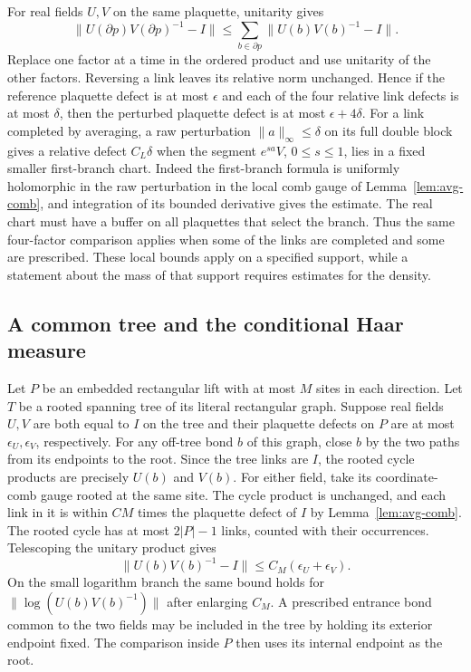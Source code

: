 \documentclass[11pt,letterpaper,reqno]{amsart}
\numberwithin{equation}{section}
\theoremstyle{definition}
\theoremstyle{remark}
\begin{document}
For real fields \(U,V\) on the same plaquette, unitarity gives
\begin{equation}\label{eq:guarded-four-link}
 \|U(\partial p)V(\partial p)^{-1}-I\|
   \leq \sum_{b\in\partial p}\|U(b)V(b)^{-1}-I\|.
\end{equation}
Replace one factor at a time in the ordered product and use
unitarity of the other factors. Reversing a link leaves its
relative norm unchanged. Hence if the reference plaquette
defect is at most \(\epsilon\) and each of the four relative
link defects is at most \(\delta\), then the perturbed
plaquette defect is at most \(\epsilon+4\delta\).
For a link completed by averaging, a raw perturbation
\(\|a\|_\infty\leq\delta\) on its full double block gives a
relative defect \(C_L\delta\) when the segment \(e^{sa}V\),
\(0\leq s\leq1\), lies in a fixed smaller first-branch chart.
Indeed the first-branch formula is
uniformly holomorphic in the raw perturbation in the local
comb gauge of Lemma~\ref{lem:avg-comb}, and integration of its
bounded derivative gives the estimate. The real chart must
have a buffer on all plaquettes that select the branch.
Thus the same four-factor comparison applies when some of the
links are completed and some are prescribed. These local bounds
apply on a specified support, while a statement about the mass
of that support requires estimates for the density.

\subsection{A common tree and the conditional Haar measure}
\label{sec:guarded-tree}

Let \(P\) be an embedded rectangular lift with at most \(M\) sites
in each direction. Let \(T\) be a rooted spanning tree of its
literal rectangular graph.
Suppose real fields \(U,V\) are both equal to \(I\) on the
tree and their plaquette defects on \(P\) are at most
\(\epsilon_U,\epsilon_V\), respectively. For any off-tree bond
\(b\) of this graph, close \(b\) by the two paths from its endpoints
to the root. Since the tree links are \(I\), the rooted cycle
products are precisely \(U(b)\) and \(V(b)\).
For either field, take its coordinate-comb gauge rooted at the
same site. The cycle product is unchanged, and each link in it
is within \(C M\) times the plaquette defect of \(I\) by
Lemma~\ref{lem:avg-comb}. The rooted cycle has at most
\(2|P|-1\) links, counted with their occurrences.
Telescoping the unitary product gives
\[
 \|U(b)V(b)^{-1}-I\|\leq C_M(\epsilon_U+\epsilon_V).
\]
On the small logarithm branch the same bound holds for
\(\|\log(U(b)V(b)^{-1})\|\) after enlarging \(C_M\).
A prescribed entrance bond common to the two fields may be
included in the tree by holding its exterior endpoint fixed.
The comparison inside \(P\) then uses its internal endpoint
as the root.
\end{document}
